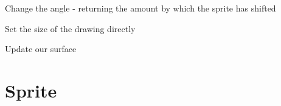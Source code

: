 \documentclass[letterpaper,10pt,english]{sphinxmanual}
\begin{document}
\begin{fulllineitems}
\begin{fulllineitems}
\end{fulllineitems}


\begin{fulllineitems}
\label{visual:serge.visual.SurfaceDrawing.setAngle}
Change the angle - returning the amount by which the sprite has shifted

\end{fulllineitems}


\begin{fulllineitems}
\label{visual:serge.visual.SurfaceDrawing.setSize}
Set the size of the drawing directly

\end{fulllineitems}


\begin{fulllineitems}
\label{visual:serge.visual.SurfaceDrawing.setSurface}
Update our surface

\end{fulllineitems}


\end{fulllineitems}



\section{Sprite}
\label{visual:sprite}
\end{document}
